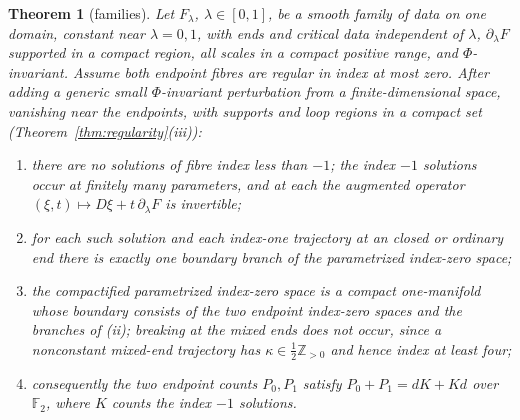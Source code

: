 \documentclass[11pt]{amsart}
\newtheorem{theorem}{Theorem}[section]
\theoremstyle{definition}
\theoremstyle{remark}
\theoremstyle{plain}
\numberwithin{equation}{section}
\newcommand{\ZZ}{\mathbb{Z}}
\newcommand{\FF}{\mathbb{F}_2}
\begin{document}
\begin{theorem}[families]\label{thm:family}
Let $F_\lambda$, $\lambda\in[0,1]$, be a smooth family of data on one
domain, constant near $\lambda=0,1$, with ends and critical data
independent of $\lambda$, $\partial_\lambda F$ supported in a compact
region, all scales in a compact positive range, and $\Phi$-invariant.
Assume both endpoint fibres are regular in index at most zero. After adding a generic
small $\Phi$-invariant perturbation from a finite-dimensional space, vanishing near the
endpoints, with supports and loop regions in a compact set
(Theorem~\ref{thm:regularity}(iii)):
\begin{enumerate}[label=(\roman*)]
\item there are no solutions of fibre index less than $-1$; the index
  $-1$ solutions occur at finitely many parameters, and at each the
  augmented operator $(\xi,t)\mapsto D\xi+t\,\partial_\lambda F$ is
  invertible;
\item for each such solution and each index-one trajectory at an
  closed or ordinary end there is exactly one boundary branch of the
  parametrized index-zero space;
\item the compactified parametrized index-zero space is a compact
  one-manifold whose boundary consists of the two endpoint index-zero
  spaces and the branches of (ii); breaking at the mixed ends does not occur,
  since a nonconstant mixed-end trajectory has $\kappa\in\frac12\ZZ_{>0}$ and
  hence index at least four;
\item consequently the two endpoint counts $P_0,P_1$ satisfy
  $P_0+P_1=dK+Kd$ over $\FF$, where $K$ counts the index $-1$ solutions.
\end{enumerate}
\end{theorem}
\end{document}
